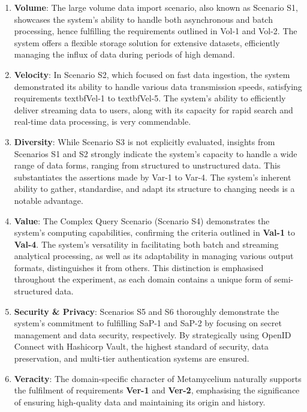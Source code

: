 \documentclass[journal]{IEEEtran}
\begin{document}
\begin{enumerate} 
  
  \item \textbf{Volume}: The large volume data import scenario, also known as Scenario S1, showcases the system's ability to handle both asynchronous and batch processing, hence fulfilling the requirements outlined in Vol-1 and Vol-2. The system offers a flexible storage solution for extensive datasets, efficiently managing the influx of data during periods of high demand.
    
    \item \textbf{Velocity}: In Scenario S2, which focused on fast data ingestion, the system demonstrated its ability to handle various data transmission speeds, satisfying requirements textbfVel-1 to textbfVel-5. The system's ability to efficiently deliver streaming data to users, along with its capacity for rapid search and real-time data processing, is very commendable.
    
    \item \textbf{Diversity}: While Scenario S3 is not explicitly evaluated, insights from Scenarios S1 and S2 strongly indicate the system's capacity to handle a wide range of data forms, ranging from structured to unstructured data. This substantiates the assertions made by Var-1 to Var-4. The system's inherent ability to gather, standardise, and adapt its structure to changing needs is a notable advantage.
    
    \item \textbf{Value}: The Complex Query Scenario (Scenario S4) demonstrates the system's computing capabilities, confirming the criteria outlined in \textbf{Val-1} to \textbf{Val-4}. The system's versatility in facilitating both batch and streaming analytical processing, as well as its adaptability in managing various output formats, distinguishes it from others. This distinction is emphasised throughout the experiment, as each domain contains a unique form of semi-structured data.
    
    \item \textbf{Security \& Privacy}: Scenarios S5 and S6 thoroughly demonstrate the system's commitment to fulfilling SaP-1 and SaP-2 by focusing on secret management and data security, respectively. By strategically using OpenID Connect with Hashicorp Vault, the highest standard of security, data preservation, and multi-tier authentication systems are ensured.
    
    \item \textbf{Veracity}: The domain-specific character of Metamycelium naturally supports the fulfilment of requirements \textbf{Ver-1} and \textbf{Ver-2}, emphasising the significance of ensuring high-quality data and maintaining its origin and history.
  
\end{enumerate}
\end{document}
